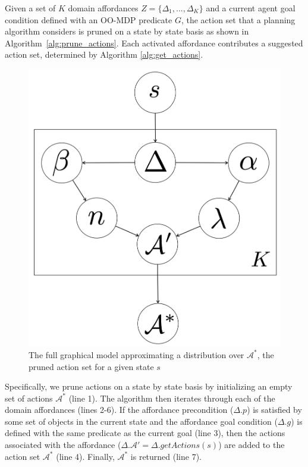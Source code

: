 \documentclass[letterpaper]{article}
\begin{document}
Given a set of $K$ domain affordances $Z = \{\Delta_1, ..., \Delta_K\}$ and a current 
agent goal condition defined with an OO-MDP predicate $G$, the action set that a 
planning algorithm considers is pruned on a state by state basis as shown in 
Algorithm~\ref{alg:prune_actions}.  Each 
activated affordance contributes a suggested action set, determined by Algorithm \ref{alg:get_actions}. 

\begin{figure}
\centering
\includegraphics[scale=0.14]{figures/learn_graphical_model.png}%
  \caption{The full graphical model approximating a distribution over $\mathcal{A}^*$, the pruned action set for a given state $s$}
  \label{fig:graphical_model}
\end{figure}

Specifically, we prune actions on a state by state basis
by initializing an empty set of actions $\mathcal{A}^*$ (line 1). The algorithm then iterates
through each of the domain affordances (lines 2-6). If the affordance
precondition ($\Delta.p$) is satisfied by some set of objects in the current state
and the affordance goal condition ($\Delta.g$) is defined with the same predicate
as the current goal (line 3), then the actions associated with the affordance ($\Delta.\mathcal{A}' = \Delta.getActions(s)$) are added to the action set $\mathcal{A}^*$ (line 4). Finally, $\mathcal{A}^*$ is returned (line 7).
\end{document}
